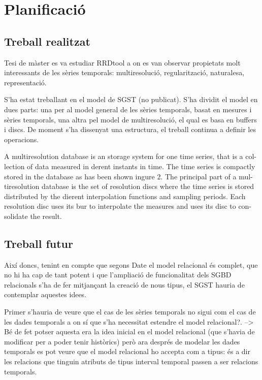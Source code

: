 \chapter{Planificació}

\section{Treball realitzat}



Tesi de màster es va estudiar RRDtool a on es van observar propietats molt interessants de les sèries temporals: multiresolució, regularització, naturalesa, representació.


S'ha estat treballant en el model de SGST (no publicat). S'ha dividit el model en dues parts: una per al model general de les sèries temporals, basat en mesures i sèries temporals, una altra pel model de multiresolució, el qual es basa en buffers i discs. De moment s'ha dissenyat una estructura, el treball continua a definir les operacions. 


A multiresolution database is an storage system for one time series, that is a col-lection of data measured in derent instants in time. The time series is compactly
stored in the database as has been shown ingure 2. The principal part of a mul-
tiresolution database is the set of resolution discs where the time series is stored
distributed by the dierent interpolation functions and sampling periods.      Each
resolution disc uses its bur to interpolate the measures and uses its disc to con-
solidate the result.


\section{Treball futur}



Així doncs, tenint en compte que segons Date el model relacional és complet, que no hi ha cap de tant potent i que l'ampliació de funcionalitat dels SGBD relacionals s'ha de fer mitjançant la creació de nous tipus, el SGST hauria de contemplar aquestes idees. 

Primer s'hauria de veure que el cas de les sèries temporals no sigui com el cas de les dades temporals a on sí que s'ha necessitat estendre el model relacional?. --> Bé de fet potser aquesta era la idea inicial en el model relacional (que s'havia de modificar per a poder tenir històrics) però ara després de modelar les dades temporals es pot veure que el model relacional ho accepta com a tipus: és a dir les relacions que tinguin atributs de tipus interval temporal passen a ser relacions temporals.

